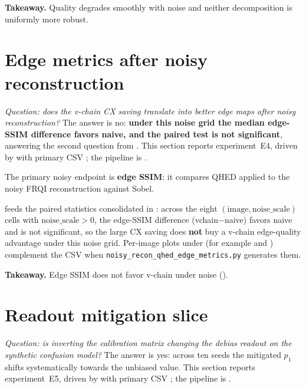 \textbf{Takeaway.} Quality degrades smoothly with noise and neither decomposition is uniformly more robust.
\FloatBarrier
\clearpage

\section{Edge metrics after noisy reconstruction}
\label{sec:res-e4}
\emph{Question: does the v-chain CX saving translate into better edge maps after noisy reconstruction?} The answer is no: \textbf{under this noise grid the median edge-SSIM difference favors naive, and the paired test is not significant}, answering the second question from . This section reports experiment~E4, driven by  with primary CSV ; the pipeline is .

The primary noisy endpoint is \textbf{edge SSIM}: it compares QHED applied to the noisy FRQI reconstruction against Sobel.



 feeds the paired statistics consolidated in : across the eight $(\mathrm{image},\mathrm{noise\_scale})$ cells with $\mathrm{noise\_scale}>0$, the edge-SSIM difference (vchain$-$naive) favors naive and is not significant, so the large CX saving does \textbf{not} buy a v-chain edge-quality advantage under this noise grid. Per-image plots under  (for example  and ) complement the CSV when \texttt{noisy\_recon\_qhed\_edge\_metrics.py} generates them.

\textbf{Takeaway.} Edge SSIM does not favor v-chain under noise ().
\FloatBarrier

\section{Readout mitigation slice}
\label{sec:res-e5}
\emph{Question: is inverting the calibration matrix changing the debias readout on the synthetic confusion model?} The answer is yes: across ten seeds the mitigated $p_1$ shifts systematically towards the unbiased value. This section reports experiment~E5, driven by  with primary CSV ; the pipeline is .

